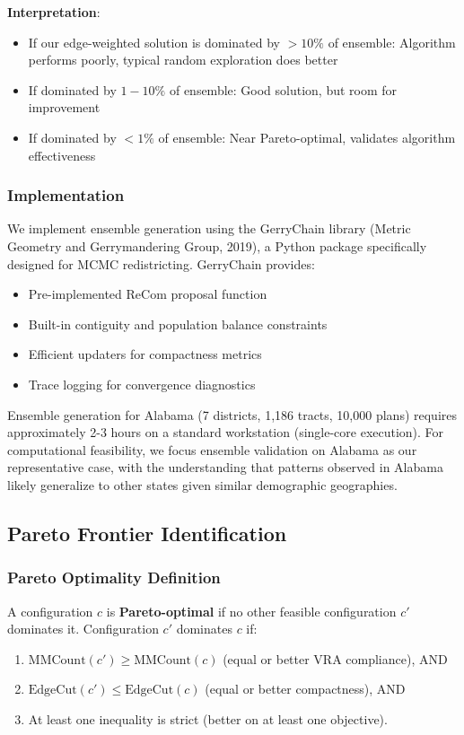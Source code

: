 \textbf{Interpretation}:
\begin{itemize}
    \item If our edge-weighted solution is dominated by $>10\%$ of ensemble: Algorithm performs poorly, typical random exploration does better
    \item If dominated by $1-10\%$ of ensemble: Good solution, but room for improvement
    \item If dominated by $<1\%$ of ensemble: Near Pareto-optimal, validates algorithm effectiveness
\end{itemize}

\subsubsection{Implementation}

We implement ensemble generation using the GerryChain library (Metric Geometry and Gerrymandering Group, 2019), a Python package specifically designed for MCMC redistricting. GerryChain provides:
\begin{itemize}
    \item Pre-implemented ReCom proposal function
    \item Built-in contiguity and population balance constraints
    \item Efficient updaters for compactness metrics
    \item Trace logging for convergence diagnostics
\end{itemize}

Ensemble generation for Alabama (7 districts, 1,186 tracts, 10,000 plans) requires approximately 2-3 hours on a standard workstation (single-core execution). For computational feasibility, we focus ensemble validation on Alabama as our representative case, with the understanding that patterns observed in Alabama likely generalize to other states given similar demographic geographies.

\subsection{Pareto Frontier Identification}

\subsubsection{Pareto Optimality Definition}

A configuration $c$ is \textbf{Pareto-optimal} if no other feasible configuration $c'$ dominates it. Configuration $c'$ dominates $c$ if:
\begin{enumerate}
    \item $\text{MMCount}(c') \geq \text{MMCount}(c)$ (equal or better VRA compliance), AND
    \item $\text{EdgeCut}(c') \leq \text{EdgeCut}(c)$ (equal or better compactness), AND
    \item At least one inequality is strict (better on at least one objective).
\end{enumerate}

